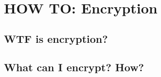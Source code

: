 \documentclass{beamer}
\begin{document}
\section{HOW TO: Encryption}
\subsection{WTF is encryption?}



\subsection{What can I encrypt? How?}
\begin{frame}
\end{frame}
\end{document}
